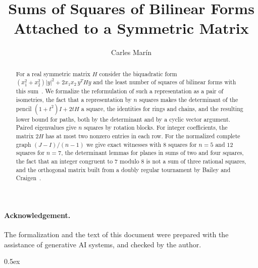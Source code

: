 \documentclass[10pt,a4paper]{article}
\begin{document}
\title{Sums of Squares of Bilinear Forms Attached to a Symmetric Matrix}
\author{Carles Mar\'in}
\maketitle

\begin{abstract}
For a real symmetric matrix $H$ consider the biquadratic form $(x_1^2+x_2^2)|y|^2+2x_1x_2\,y^{T}Hy$ and the least number of squares of bilinear forms with this sum~\cite{HanselkaSinn2019}. We formalize the reformulation of such a representation as a pair of isometries, the fact that a representation by $n$ squares makes the determinant of the pencil $(1+t^2)I+2tH$ a square, the identities for rings and chains, and the resulting lower bound for paths, both by the determinant and by a cyclic vector argument. Paired eigenvalues give $n$ squares by rotation blocks. For integer coefficients, the matrix $2H$ has at most two nonzero entries in each row. For the normalized complete graph $(J-I)/(n-1)$ we give exact witnesses with $8$ squares for $n=5$ and $12$ squares for $n=7$, the determinant lemmas for planes in sums of two and four squares, the fact that an integer congruent to $7$ modulo $8$ is not a sum of three rational squares, and the orthogonal matrix built from a doubly regular tournament by Bailey and Craigen~\cite{BaileyCraigen2019}.
\end{abstract}

\paragraph{Acknowledgement.} The formalization and the text of this document were prepared with the
assistance of generative AI systems, and checked by the author.

\tableofcontents

\parindent 0pt\parskip 0.5ex





\end{document}
